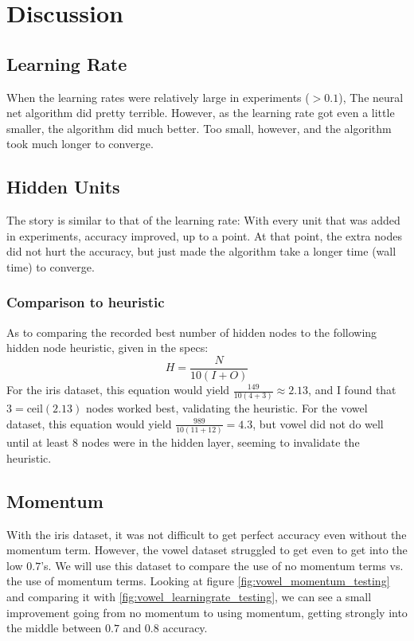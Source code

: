 \documentclass[12pt]{article}
\begin{document}
\section{Discussion}
\subsection{Learning Rate}
When the learning rates were relatively large in experiments ($ > 0.1$), The neural net algorithm did pretty terrible. However, as the learning rate got even a little smaller, the algorithm did much better. Too small, however, and the algorithm took much longer to converge.
\subsection{Hidden Units}
The story is similar to that of the learning rate: With every unit that was
added in experiments, accuracy improved, up to a point. At that point, the extra
nodes did not hurt the accuracy, but just made the algorithm take a longer time
(wall time) to converge.
\subsubsection{Comparison to heuristic}
As to comparing the recorded best number of hidden nodes to the following
hidden node heuristic, given in the specs:
\begin{equation*}
    H=\frac{N}{10(I+O)}
\end{equation*}
For the iris dataset, this equation would yield $\frac{149}{10(4+3)} \approx 2.13$, and I found that $3=\text{ceil}(2.13)$ nodes worked best, validating the heuristic.
For the vowel dataset, this equation would yield $\frac{989}{10(11+12)} = 4.3$, but vowel did not do well until at least 8 nodes were in the hidden layer, seeming
to invalidate the heuristic.
\subsection{Momentum}
With the iris dataset, it was not difficult to get perfect accuracy even without the momentum term. However, the vowel dataset struggled to get even to get into the low $0.7$'s. We will use this dataset to compare the use of no momentum terms vs. the use of momentum terms.
Looking at figure \ref{fig:vowel_momentum_testing} and comparing it with \ref{fig:vowel_learningrate_testing}, we can see a small improvement going from no momentum to using momentum, getting strongly into the middle between $0.7$ and $0.8$ accuracy.
\end{document}
